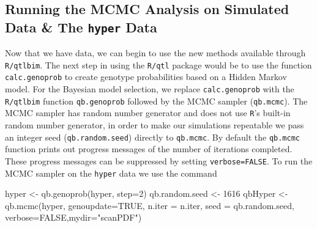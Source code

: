 \documentclass[12pt]{article}
\begin{document}
\subsection{Running the MCMC Analysis on Simulated Data \& 
The {\tt hyper} Data}
Now that we have data, we can begin to use the new methods available 
through {\tt R/qtlbim}. The next step in using the {\tt R/qtl} package 
would be to use the function {\tt calc.genoprob} to create  genotype 
probabilities based on a Hidden Markov model.  For the Bayesian model 
selection, we replace  {\tt calc.genoprob} with  the  {\tt R/qtlbim} 
function {\tt qb.genoprob} followed by the MCMC sampler 
({\tt qb.mcmc}).  The MCMC sampler has random number generator 
and does not use {\tt R}'s built-in random number generator, in order 
to make our simulations repeatable we pass an integer seed 
({\tt qb.random.seed}) directly to {\tt qb.mcmc}.  
By default the {\tt qb.mcmc} function prints out progress messages 
of the number of iterations completed.  These progress messages can be 
suppressed by setting {\tt verbose=FALSE}.  To run the MCMC sampler on 
the {\tt hyper} data we use the command
\begin{Schunk}
\begin{Sinput}
hyper <- qb.genoprob(hyper, step=2)
qb.random.seed <- 1616
qbHyper <- qb.mcmc(hyper, genoupdate=TRUE, n.iter = n.iter, 
  seed = qb.random.seed, verbose=FALSE,mydir="scanPDF")
\end{Sinput}
\end{Schunk}
\end{document}
